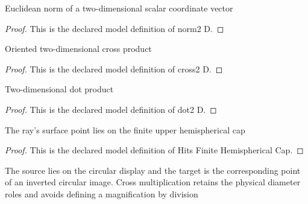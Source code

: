 \begin{definition}[norm2 D]
  \label{def:physics:phyx-mini-0110:phyxminiproblems-problemphyxmini0110-norm2d}
  Euclidean norm of a two-dimensional scalar coordinate vector
\end{definition}
\begin{proof}
  This is the declared model definition of norm2 D.
\end{proof}
\begin{definition}[cross2 D]
  \label{def:physics:phyx-mini-0110:phyxminiproblems-problemphyxmini0110-cross2d}
  Oriented two-dimensional cross product
\end{definition}
\begin{proof}
  This is the declared model definition of cross2 D.
\end{proof}
\begin{definition}[dot2 D]
  \label{def:physics:phyx-mini-0110:phyxminiproblems-problemphyxmini0110-dot2d}
  Two-dimensional dot product
\end{definition}
\begin{proof}
  This is the declared model definition of dot2 D.
\end{proof}
\begin{definition}
  \label{def:physics:phyx-mini-0110:phyxminiproblems-problemphyxmini0110-hitsfinitehemisphericalcap}
  The ray's surface point lies on the finite upper hemispherical cap
\end{definition}
\begin{proof}
  This is the declared model definition of Hits Finite Hemispherical Cap.
\end{proof}
\begin{definition}
  \label{def:physics:phyx-mini-0110:phyxminiproblems-problemphyxmini0110-connectsdisplaypointtoimagepoint}
  The source lies on the circular display and the target is the corresponding point of an inverted circular image. Cross multiplication retains the physical diameter roles and avoids defining a magnification by division
\end{definition}

